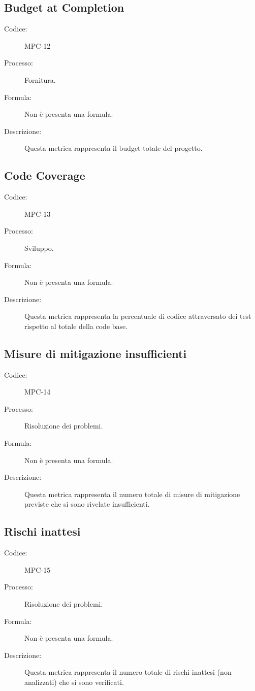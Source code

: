\subsection{Budget at Completion}
\begin{description}
    \item[Codice:] MPC-12
    \item[Processo:] Fornitura.
    \item[Formula:] Non è presenta una formula.
    \item[Descrizione:] Questa metrica rappresenta il budget totale del progetto.
\end{description}

\subsection{Code Coverage}
\begin{description}
    \item[Codice:] MPC-13
    \item[Processo:] Sviluppo.
    \item[Formula:] Non è presenta una formula.
    \item[Descrizione:] Questa metrica rappresenta la percentuale di codice attraversato dei test rispetto al totale della code base.
\end{description}

\subsection{Misure di mitigazione insufficienti}
\begin{description}
    \item[Codice:] MPC-14
    \item[Processo:] Risoluzione dei problemi.
    \item[Formula:] Non è presenta una formula.
    \item[Descrizione:] Questa metrica rappresenta il numero totale di misure di mitigazione previste che si sono rivelate insufficienti.
\end{description}

\subsection{Rischi inattesi}
\begin{description}
    \item[Codice:] MPC-15
    \item[Processo:] Risoluzione dei problemi.
    \item[Formula:] Non è presenta una formula.
    \item[Descrizione:] Questa metrica rappresenta il numero totale di rischi inattesi (non analizzati) che si sono verificati.
\end{description}
\newpage
